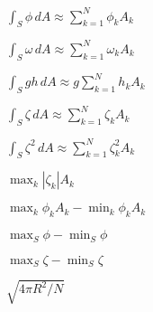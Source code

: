 \documentclass{article}
\begin{document}
$ \int_S \phi \, dA \approx \sum_{k=1}^N \phi_k A_k $
\pagebreak

$ \int_S \omega \, dA \approx \sum_{k=1}^N \omega_k A_k $
\pagebreak

$ \int_S gh \, dA \approx g\sum_{k=1}^N h_k A_k $
\pagebreak

$ \int_S \zeta \, dA \approx \sum_{k=1}^N \zeta_k A_k $
\pagebreak

$ \int_S \zeta^2 \, dA \approx \sum_{k=1}^N \zeta_k^2 A_k $
\pagebreak

$ \max_k |\zeta_k|A_k $
\pagebreak

$ \max_k \phi_k A_k - \min_k \phi_k A_k $
\pagebreak

$ \max_S \phi - \min_S\phi $
\pagebreak

$ \max_S \zeta - \min_S\zeta $
\pagebreak

$ \sqrt{4\pi R^2/N} $
\pagebreak
\end{document}

